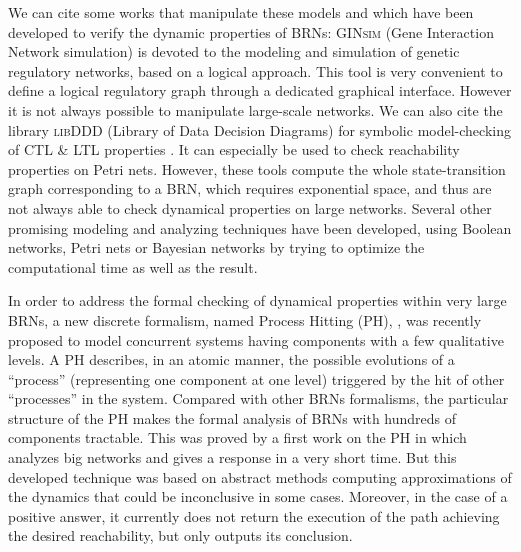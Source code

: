 We can cite some works that manipulate these models and which have been developed to verify the dynamic properties of BRNs: \textsc{GINsim} (Gene Interaction Network simulation) \cite{chaouiya2012logical, gonzalez2006ginsim} is devoted to the modeling and simulation of genetic regulatory networks, based on a logical approach. This tool is very convenient  to define a logical regulatory graph through a dedicated graphical interface. However it is not always possible to manipulate large-scale networks.
We can also cite the library \textsc{libDDD} (Library of Data Decision Diagrams) for symbolic model-checking of CTL \& LTL properties \cite{libddd, Kordon09libddd}. It can especially be used to check reachability properties on Petri nets.
However, these tools compute the whole state-transition graph corresponding to a BRN, which requires exponential space,
and thus are not always able to check dynamical properties on large networks.
Several other promising modeling and analyzing techniques have been developed, using Boolean networks, Petri nets \cite{heljanko2001answer} or Bayesian networks \cite{numata2008partial} by trying to optimize the computational time as well as the result. %



In order to address the formal checking of dynamical properties within very large BRNs, a new discrete formalism, named Process Hitting (PH), \cite{PMR10-TCSB}, was recently proposed to model concurrent systems having components with a few qualitative levels. A PH describes, in an atomic manner, the possible evolutions of a ``process'' (representing one component at one level) triggered by the hit of other ``processes'' in the system. Compared with other BRNs formalisms, the particular structure of the PH makes the formal analysis of BRNs with hundreds of components tractable. This was proved by a first work on the PH in \cite{PMR12-MSCS} which analyzes big networks and gives a response in a very short time. But this developed technique was based on abstract methods computing approximations of the dynamics that could be inconclusive in some cases. Moreover, in the case of a positive answer, it currently does not return the execution of the path achieving the desired reachability, but only outputs its conclusion.

